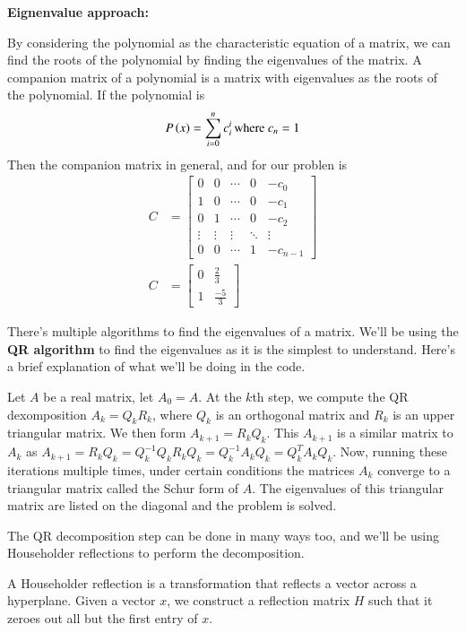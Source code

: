 \documentclass[journal]{IEEEtran}
\begin{document}
\textbf{Eignenvalue approach:}

By considering the polynomial as the characteristic equation of a matrix, we can find the roots of the polynomial by finding the eigenvalues of the matrix. A companion matrix of a polynomial is a matrix with eigenvalues as the roots of the polynomial. If the polynomial is 
\begin{align}
  P\left(x\right)=\sum\limits_{i=0}^n c_i^{i}\,\text{where }c_n = 1
\end{align}
Then the companion matrix in general, and for our problen is 
\begin{align}
  C &= \begin{bmatrix}
    0&0&\cdots&0&-c_0\\
    1&0&\cdots&0&-c_1\\
    0&1&\cdots&0&-c_2\\
    \vdots&\vdots&\vdots&\ddots&\vdots\\
    0&0&\cdots&1&-c_{n-1}
  \end{bmatrix}\\
  C &= \begin{bmatrix}
    0&\frac{2}{3}\\
    1&\frac{-5}{3}
  \end{bmatrix}
\end{align}

There's multiple algorithms to find the eigenvalues of a matrix. We'll be using the \textbf{QR algorithm} to find the eigenvalues as it is the simplest to understand. Here's a brief explanation of what we'll be doing in the code. 

Let $A$ be a real matrix, let $A_0 = A$. At the $k$th step, we compute the QR dexomposition $A_k = Q_kR_k$, where $Q_k$ is an orthogonal matrix and $R_k$ is an upper triangular matrix. We then form $A_{k+1} = R_kQ_k$. This $A_{k+1}$ is a similar matrix to $A_k$  as $A_{k+1} = R_kQ_k = Q^{-1}_kQ_kR_kQ_k = Q^{-1}_kA_kQ_k = Q^T_kA_kQ_k$. Now, running these iterations multiple times, under certain conditions the matrices $A_k$ converge to a triangular matrix called the Schur form of $A$. The eigenvalues of this triangular matrix are listed on the diagonal and the problem is solved. 

The QR decomposition step can be done in many ways too, and we'll be using Householder reflections to perform the decomposition. 

A Householder reflection is a transformation that reflects a vector across a hyperplane. Given a vector $x$, we construct a reflection matrix $H$ such that it zeroes out all but the first entry of $x$. 
\end{document}
